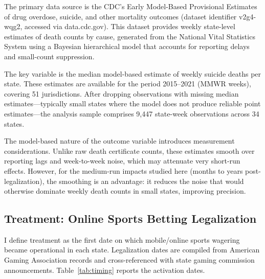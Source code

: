 \documentclass[12pt]{article}
\begin{document}
The primary data source is the CDC's Early Model-Based Provisional Estimates of drug overdose, suicide, and other mortality outcomes (dataset identifier v2g4-wqg2, accessed via data.cdc.gov). This dataset provides weekly state-level estimates of death counts by cause, generated from the National Vital Statistics System using a Bayesian hierarchical model that accounts for reporting delays and small-count suppression.

The key variable is the median model-based estimate of weekly suicide deaths per state. These estimates are available for the period 2015--2021 (MMWR weeks), covering 51 jurisdictions. After dropping observations with missing median estimates---typically small states where the model does not produce reliable point estimates---the analysis sample comprises 9,447 state-week observations across 34 states.

The model-based nature of the outcome variable introduces measurement considerations. Unlike raw death certificate counts, these estimates smooth over reporting lags and week-to-week noise, which may attenuate very short-run effects. However, for the medium-run impacts studied here (months to years post-legalization), the smoothing is an advantage: it reduces the noise that would otherwise dominate weekly death counts in small states, improving precision.

\subsection{Treatment: Online Sports Betting Legalization}

I define treatment as the first date on which mobile/online sports wagering became operational in each state. Legalization dates are compiled from American Gaming Association records and cross-referenced with state gaming commission announcements. Table~\ref{tab:timing} reports the activation dates.
\end{document}

